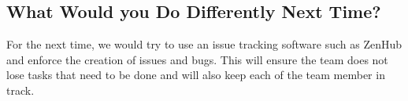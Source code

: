 \documentclass{article}
\begin{document}
	\subsection{What Would you Do Differently Next Time?}
	
	For the next time, we would try to use an issue tracking software such as ZenHub and enforce the creation of issues and bugs. This will ensure the team does not lose tasks that need to be done and will also keep each of the team member in track.
	
\end{document}
